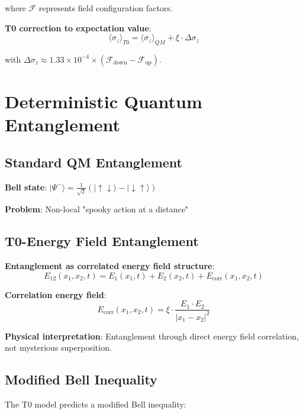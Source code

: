 \documentclass[12pt,a4paper]{article}
\newcommand{\Efield}{E}
\newcommand{\xipar}{\xi}
\begin{document}
	where $\mathcal{F}$ represents field configuration factors.
	
	\textbf{T0 correction to expectation value}:
	\begin{equation}
		\langle \sigma_z \rangle_{T0} = \langle \sigma_z \rangle_{QM} + \xipar \cdot \Delta\sigma_z
	\end{equation}
	
	with $\Delta\sigma_z \approx 1.33 \times 10^{-4} \times (\mathcal{F}_{\text{down}} - \mathcal{F}_{\text{up}})$.
	
	\section{Deterministic Quantum Entanglement}
	
	\subsection{Standard QM Entanglement}
	
	\textbf{Bell state}: $|\Psi^-\rangle = \frac{1}{\sqrt{2}}(|{\uparrow\downarrow}\rangle - |{\downarrow\uparrow}\rangle)$
	
	\textbf{Problem}: Non-local "spooky action at a distance"
	
	\subsection{T0-Energy Field Entanglement}
	
	\textbf{Entanglement as correlated energy field structure}:
	\begin{equation}
		\boxed{\Efield_{12}(x_1, x_2, t) = \Efield_1(x_1, t) + \Efield_2(x_2, t) + \Efield_{\text{corr}}(x_1, x_2, t)}
	\end{equation}
	
	\textbf{Correlation energy field}:
	\begin{equation}
		\Efield_{\text{corr}}(x_1, x_2, t) = \xipar \cdot \frac{\Efield_1 \cdot \Efield_2}{|x_1 - x_2|^2}
	\end{equation}
	
	\textbf{Physical interpretation}: Entanglement through direct energy field correlation, not mysterious superposition.
	
	\subsection{Modified Bell Inequality}
	
	The T0 model predicts a modified Bell inequality:
	
\end{document}
